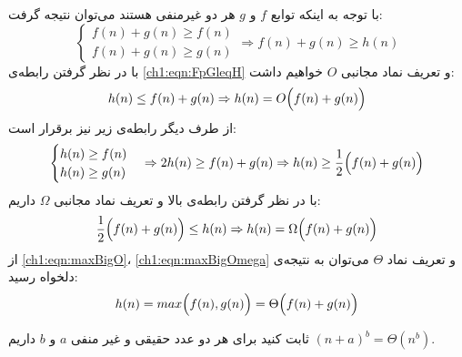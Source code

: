 با توجه به اینکه توابع {$f$} و {$g$} هر دو غیرمنفی هستند می‌توان نتیجه گرفت:
\begin{equation}
\begin{cases}
f(n)+g(n) \geq f(n)\\
f(n)+g(n) \geq g(n)
\end{cases}
\Longrightarrow f(n)+g(n) \geq h(n)\label{ch1:eqn:FpGleqH}
\end{equation}
با در نظر گرفتن رابطه‌ی {\eqref{ch1:eqn:FpGleqH}} و تعریف نماد مجانبی {$O$} خواهیم داشت:
\begin{equation}
h(n) \leq f(n)+g(n) \Rightarrow h(n) = O\Bigl( f(n)+g(n)\Bigr) \label{ch1:eqn:maxBigO}
\end{equation}
از طرف دیگر رابطه‌ی زیر نیز برقرار است:
\begin{displaymath}
\begin{cases}
h(n) \geq f(n)\\
h(n) \geq g(n)
\end{cases}
\Rightarrow 2h(n) \geq f(n)+g(n) \Rightarrow h(n) \geq \frac{1}{2} \Bigl( f(n)+g(n) \Bigr) 
\end{displaymath}
با در نظر گرفتن رابطه‌‌ی بالا و تعریف نماد مجانبی {$\Omega$} داریم:
\begin{equation}
\frac{1}{2} \Bigl( f(n)+g(n) \Bigr) \leq h(n) \Rightarrow h(n) = \Omega \Bigl( f(n)+g(n) \Bigr) \label{ch1:eqn:maxBigOmega}
\end{equation}
از {\eqref{ch1:eqn:maxBigO}}، {\eqref{ch1:eqn:maxBigOmega}} و تعریف نماد {$\Theta$} می‌توان به نتیجه‌ی دلخواه رسید:
\begin{displaymath}
 h(n)=max\Bigl( f(n),g(n)\Bigr) =\Theta \Bigl( f(n)+g(n) \Bigr)
\end{displaymath}

 ثابت کنید برای هر دو عدد حقیقی و غیر منفی  {$a$} و {$b$} داریم {$(n+a)^b=\Theta (n^b)$}.


